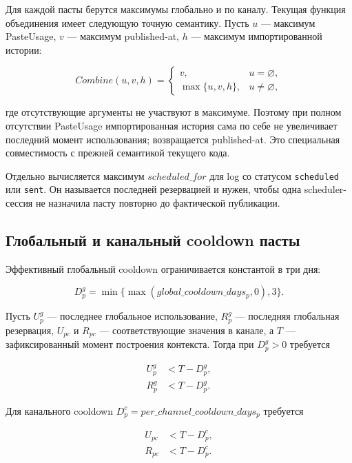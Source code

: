 \documentclass[12pt,a4paper]{article}
\newcommand{\Empty}{\varnothing}
\newcommand{\Status}[1]{\texttt{#1}}
\begin{document}
Для каждой пасты берутся максимумы глобально и по каналу. Текущая функция
объединения имеет следующую точную семантику. Пусть $u$ --- максимум PasteUsage,
$v$ --- максимум published-at, $h$ --- максимум импортированной истории:

\begin{equation}
  Combine(u,v,h)=
  \begin{cases}
    v,&u=\Empty,\\
    \max\{u,v,h\},&u\neq\Empty,
  \end{cases}
  \label{eq:combine-history}
\end{equation}

где отсутствующие аргументы не участвуют в максимуме. Поэтому при полном
отсутствии PasteUsage импортированная история сама по себе не увеличивает
последний момент использования; возвращается published-at. Это специальная
совместимость с прежней семантикой текущего кода.

Отдельно вычисляется максимум $scheduled\_for$ для log со статусом
\Status{scheduled} или \Status{sent}. Он называется последней резервацией и
нужен, чтобы одна scheduler-сессия не назначила пасту повторно до фактической
публикации.

\subsection{Глобальный и канальный cooldown пасты}

Эффективный глобальный cooldown ограничивается константой в три дня:

\begin{equation}
  D_p^g=
  \min\{\max(global\_cooldown\_days_p,0),3\}.
  \label{eq:global-paste-cooldown}
\end{equation}

Пусть $U_p^g$ --- последнее глобальное использование, $R_p^g$ --- последняя
глобальная резервация, $U_{pc}$ и $R_{pc}$ --- соответствующие значения в
канале, а $T$ --- зафиксированный момент построения контекста. Тогда при
$D_p^g>0$ требуется

\begin{align}
  U_p^g&<T-D_p^g,\\
  R_p^g&<T-D_p^g.
  \label{eq:global-paste-cooldown-constraints}
\end{align}

Для канального cooldown $D_p^c=per\_channel\_cooldown\_days_p$ требуется

\begin{align}
  U_{pc}&<T-D_p^c,\\
  R_{pc}&<T-D_p^c.
  \label{eq:channel-paste-cooldown-constraints}
\end{align}
\end{document}
